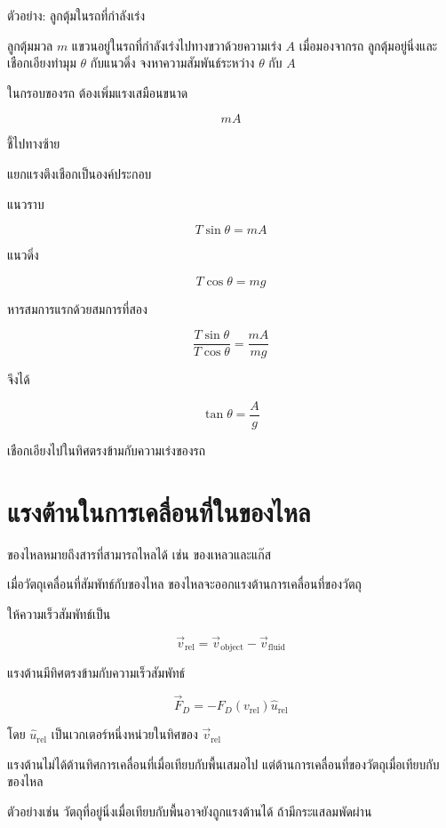 \begin{examplebox}{ตัวอย่าง: ลูกตุ้มในรถที่กำลังเร่ง}

ลูกตุ้มมวล $m$ แขวนอยู่ในรถที่กำลังเร่งไปทางขวาด้วยความเร่ง $A$
เมื่อมองจากรถ ลูกตุ้มอยู่นิ่งและเชือกเอียงทำมุม $\theta$
กับแนวดิ่ง จงหาความสัมพันธ์ระหว่าง $\theta$ กับ $A$

ในกรอบของรถ ต้องเพิ่มแรงเสมือนขนาด

\[
mA
\]

ชี้ไปทางซ้าย

แยกแรงตึงเชือกเป็นองค์ประกอบ

แนวราบ

\[
T\sin\theta=mA
\]

แนวดิ่ง

\[
T\cos\theta=mg
\]

หารสมการแรกด้วยสมการที่สอง

\[
\frac{T\sin\theta}{T\cos\theta}
=
\frac{mA}{mg}
\]

จึงได้

\[
\boxed{
\tan\theta=\frac{A}{g}
}
\]

เชือกเอียงไปในทิศตรงข้ามกับความเร่งของรถ
\end{examplebox}

\section{แรงต้านในการเคลื่อนที่ในของไหล}

ของไหลหมายถึงสารที่สามารถไหลได้ เช่น ของเหลวและแก๊ส

เมื่อวัตถุเคลื่อนที่สัมพัทธ์กับของไหล ของไหลจะออกแรงต้านการเคลื่อนที่ของวัตถุ

ให้ความเร็วสัมพัทธ์เป็น

\[
\vec v_{\text{rel}}
=
\vec v_{\text{object}}
-
\vec v_{\text{fluid}}
\]

แรงต้านมีทิศตรงข้ามกับความเร็วสัมพัทธ์

\[
\boxed{
\vec F_D
=
-F_D(v_{\text{rel}})
\hat{u}_{\text{rel}}
}
\]

โดย $\hat{u}_{\text{rel}}$ เป็นเวกเตอร์หนึ่งหน่วยในทิศของ
$\vec v_{\text{rel}}$

\begin{tcolorbox}[title=ข้อควรระวัง]
แรงต้านไม่ได้ต้านทิศการเคลื่อนที่เมื่อเทียบกับพื้นเสมอไป
แต่ต้านการเคลื่อนที่ของวัตถุเมื่อเทียบกับของไหล

ตัวอย่างเช่น วัตถุที่อยู่นิ่งเมื่อเทียบกับพื้นอาจยังถูกแรงต้านได้
ถ้ามีกระแสลมพัดผ่าน
\end{tcolorbox}

